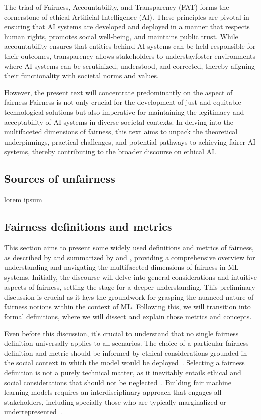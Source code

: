 The triad of Fairness, Accountability, and Transparency (FAT) forms the cornerstone of ethical Artificial Intelligence (AI). These principles are pivotal in ensuring that AI systems are developed and deployed in a manner that respects human rights, promotes social well-being, and maintains public trust. While accountability ensures that entities behind AI systems can be held responsible for their outcomes, transparency allows stakeholders to understayfoster environments where AI systems can be scrutinized, understood, and corrected, thereby aligning their functionality with societal norms and values. 

However, the present text will concentrate predominantly on the aspect of fairness Fairness is not only crucial for the development of just and equitable technological solutions but also imperative for maintaining the legitimacy and acceptability of AI systems in diverse societal contexts. In delving into the multifaceted dimensions of fairness, this text aims to unpack the theoretical underpinnings, practical challenges, and potential pathways to achieving fairer AI systems, thereby contributing to the broader discourse on ethical AI.

\subsection{Sources of unfairness}


lorem ipsum

\subsection{Fairness definitions and metrics}

This section aims to present some widely used definitions and metrics of fairness, as described by \cite{Verma2018} and summarized by \cite{Mehrabi2019} and \cite{caton2023}, providing a comprehensive overview for understanding and navigating the multifaceted dimensions of fairness in ML systems. Initially, the discourse will delve into general considerations and intuitive aspects of fairness, setting the stage for a deeper understanding. This preliminary discussion is crucial as it lays the groundwork for grasping the nuanced nature of fairness notions within the context of ML. Following this, we will transition into formal definitions, where we will dissect and explain those metrics and concepts.

Even before this discussion, it's crucial to understand that no single fairness definition universally applies to all scenarios. The choice of a particular fairness definition and metric should be informed by ethical considerations grounded in the social context in which the model would be deployed~\citep{AlerTubella2022}. Selecting a fairness definition is not a purely technical matter, as it inevitably entails ethical and social considerations that should not be neglected~\citep{Alves2023}. Building fair machine learning models requires an interdisciplinary approach that engages all stakeholders, including specially those who are typically marginalized or underrepresented~\citep{Weinberg2022}.

